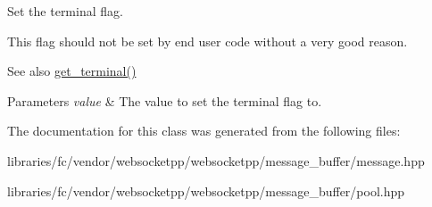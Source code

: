 Set the terminal flag. 

This flag should not be set by end user code without a very good reason.

\begin{DoxySeeAlso}{See also}
\mbox{\hyperlink{classwebsocketpp_1_1message__buffer_1_1message_a45e39497d283ec38d1360b60a5879e32}{get\+\_\+terminal()}}
\end{DoxySeeAlso}

\begin{DoxyParams}{Parameters}
{\em value} & The value to set the terminal flag to. \\
\hline
\end{DoxyParams}


The documentation for this class was generated from the following files\+:\begin{DoxyCompactItemize}
\item 
libraries/fc/vendor/websocketpp/websocketpp/message\+\_\+buffer/message.\+hpp\item 
libraries/fc/vendor/websocketpp/websocketpp/message\+\_\+buffer/pool.\+hpp\end{DoxyCompactItemize}
